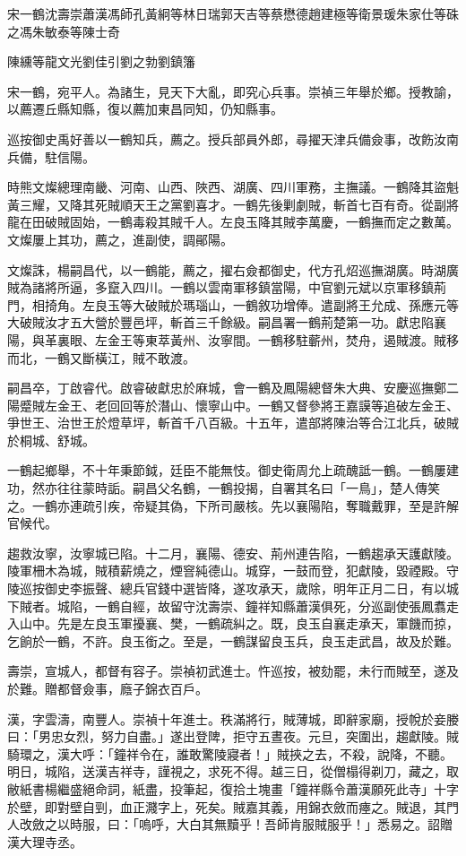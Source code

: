 
\begin{pinyinscope}
宋一鶴沈壽崇蕭漢馮師孔黃絅等林日瑞郭天吉等蔡懋德趙建極等衛景瑗朱家仕等硃之馮朱敏泰等陳士奇{{陳纁等龍文光劉佳引劉之勃劉鎮籓

宋一鶴，宛平人。為諸生，見天下大亂，即究心兵事。崇禎三年舉於鄉。授教諭，以薦遷丘縣知縣，復以薦加東昌同知，仍知縣事。

巡按御史禹好善以一鶴知兵，薦之。授兵部員外郎，尋擢天津兵備僉事，改飭汝南兵備，駐信陽。

時熊文燦總理南畿、河南、山西、陜西、湖廣、四川軍務，主撫議。一鶴降其盜魁黃三耀，又降其死賊順天王之黨劉喜才。一鶴先後剿劇賊，斬首七百有奇。從副將龍在田破賊固始，一鶴毒殺其賊千人。左良玉降其賊李萬慶，一鶴撫而定之數萬。文燦屢上其功，薦之，進副使，調鄖陽。

文燦誅，楊嗣昌代，以一鶴能，薦之，擢右僉都御史，代方孔炤巡撫湖廣。時湖廣賊為諸將所逼，多竄入四川。一鶴以雲南軍移鎮當陽，中官劉元斌以京軍移鎮荊門，相掎角。左良玉等大破賊於瑪瑙山，一鶴敘功增俸。遣副將王允成、孫應元等大破賊汝才五大營於豐邑坪，斬首三千餘級。嗣昌署一鶴荊楚第一功。獻忠陷襄陽，與革裏眼、左金王等東萃黃州、汝寧間。一鶴移駐蘄州，焚舟，遏賊渡。賊移而北，一鶴又斷橫江，賊不敢渡。

嗣昌卒，丁啟睿代。啟睿破獻忠於麻城，會一鶴及鳳陽總督朱大典、安慶巡撫鄭二陽蹙賊左金王、老回回等於潛山、懷寧山中。一鶴又督參將王嘉謨等追破左金王、爭世王、治世王於燈草坪，斬首千八百級。十五年，遣部將陳治等合江北兵，破賊於桐城、舒城。

一鶴起鄉舉，不十年秉節鉞，廷臣不能無忮。御史衛周允上疏醜詆一鶴。一鶴屢建功，然亦往往蒙時詬。嗣昌父名鶴，一鶴投揭，自署其名曰「一鳥」，楚人傳笑之。一鶴亦連疏引疾，帝疑其偽，下所司嚴核。先以襄陽陷，奪職戴罪，至是許解官候代。

趨救汝寧，汝寧城已陷。十二月，襄陽、德安、荊州連告陷，一鶴趨承天護獻陵。陵軍柵木為城，賊積薪燒之，煙窨純德山。城穿，一鼓而登，犯獻陵，毀禋殿。守陵巡按御史李振聲、總兵官錢中選皆降，遂攻承天，歲除，明年正月二日，有以城下賊者。城陷，一鶴自經，故留守沈壽崇、鐘祥知縣蕭漢俱死，分巡副使張鳳翥走入山中。先是左良玉軍擾襄、樊，一鶴疏糾之。既，良玉自襄走承天，軍饑而掠，乞餉於一鶴，不許。良玉銜之。至是，一鶴謀留良玉兵，良玉走武昌，故及於難。

壽崇，宣城人，都督有容子。崇禎初武進士。忤巡按，被劾罷，未行而賊至，遂及於難。贈都督僉事，廕子錦衣百戶。

漢，字雲濤，南豐人。崇禎十年進士。秩滿將行，賊薄城，即辭家廟，授帨於妾媵曰：「男忠女烈，努力自盡。」遂出登陴，拒守五晝夜。元旦，突圍出，趨獻陵。賊騎環之，漢大呼：「鐘祥令在，誰敢驚陵寢者！」賊挾之去，不殺，說降，不聽。明日，城陷，送漢吉祥寺，謹視之，求死不得。越三日，從僧榻得剃刀，藏之，取敝紙書楊繼盛絕命詞，紙盡，投筆起，復拾土塊畫「鐘祥縣令蕭漢願死此寺」十字於壁，即對壁自剄，血正濺字上，死矣。賊嘉其義，用錦衣斂而瘞之。賊退，其門人改斂之以時服，曰：「嗚呼，大白其無黷乎！吾師肯服賊服乎！」悉易之。詔贈漢大理寺丞。

}}
\end{pinyinscope}
